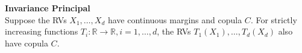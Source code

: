 \textbf{Invariance Principal}\\
Suppose the \ac{RV}s $ X_1, \ldots, X_d $  have continuous margins and copula $C$. For strictly increasing functions $T_i : \mathbb{R} \rightarrow \mathbb{R}, i = 1, \ldots, d$, the \ac{RV}s $T_1(X_1), \ldots, T_d(X_d)$ also have copula $C$.
%




